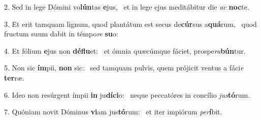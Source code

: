 2. Sed in lege Dómini vo\textbf{lún}tas \textbf{e}jus, \ast\  et in lege ejus meditábitur die \textit{ac} \textbf{noc}te.\

3. Et erit tamquam lignum, quod plantátum est secus de\textbf{cúr}sus a\textbf{quá}rum, \ast\  quod fructum suum dabit in témpo\textit{re} \textbf{su}o:\

4. Et fólium \textbf{e}jus non \textbf{dé}\textbf{flu}et: \ast\  et ómnia quæcúmque fáciet, prospe\textit{ra}\textbf{bún}tur.\

5. Non sic \textbf{ím}pii, \textbf{non} sic: \ast\  sed tamquam pulvis, quem prójicit ventus a fáci\textit{e} \textbf{ter}ræ.\

6. Ideo non resúrgent ímpii \textbf{in} ju\textbf{dí}\textbf{ci}o: \ast\  neque peccatóres in concílio \textit{jus}\textbf{tó}rum.\

7. Quóniam novit Dóminus \textbf{vi}am jus\textbf{tó}rum: \ast\  et iter impiórum \textit{per}\textbf{í}bit.\


